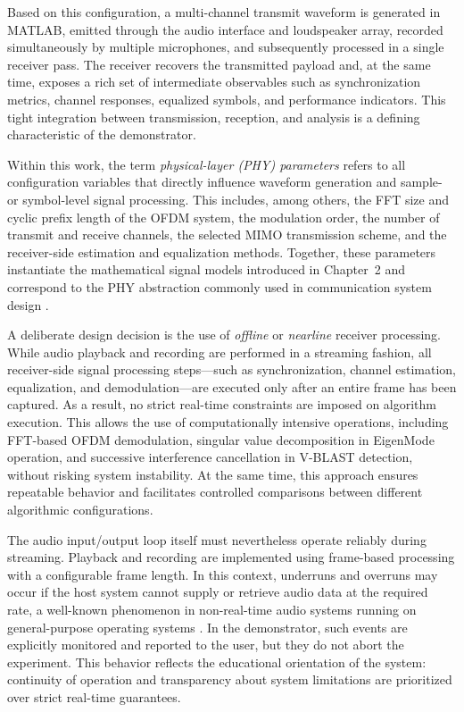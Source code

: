 Based on this configuration, a multi-channel transmit waveform is generated in MATLAB, emitted through the audio interface and loudspeaker array, recorded simultaneously by multiple microphones, and subsequently processed in a single receiver pass. The receiver recovers the transmitted payload and, at the same time, exposes a rich set of intermediate observables such as synchronization metrics, channel responses, equalized symbols, and performance indicators. This tight integration between transmission, reception, and analysis is a defining characteristic of the demonstrator.

Within this work, the term \emph{physical-layer (PHY) parameters} refers to all configuration variables that directly influence waveform generation and sample- or symbol-level signal processing. This includes, among others, the FFT size and cyclic prefix length of the OFDM system, the modulation order, the number of transmit and receive channels, the selected MIMO transmission scheme, and the receiver-side estimation and equalization methods. Together, these parameters instantiate the mathematical signal models introduced in Chapter~2 and correspond to the PHY abstraction commonly used in communication system design \cite{proakis2008digital,tse2005fundamentals}.

A deliberate design decision is the use of \emph{offline} or \emph{nearline} receiver processing. While audio playback and recording are performed in a streaming fashion, all receiver-side signal processing steps—such as synchronization, channel estimation, equalization, and demodulation—are executed only after an entire frame has been captured. As a result, no strict real-time constraints are imposed on algorithm execution. This allows the use of computationally intensive operations, including FFT-based OFDM demodulation, singular value decomposition in EigenMode operation, and successive interference cancellation in V-BLAST detection, without risking system instability. At the same time, this approach ensures repeatable behavior and facilitates controlled comparisons between different algorithmic configurations.

The audio input/output loop itself must nevertheless operate reliably during streaming. Playback and recording are implemented using frame-based processing with a configurable frame length. In this context, underruns and overruns may occur if the host system cannot supply or retrieve audio data at the required rate, a well-known phenomenon in non-real-time audio systems running on general-purpose operating systems \cite{mathworks_apr,mathworks_audio_buffering}. In the demonstrator, such events are explicitly monitored and reported to the user, but they do not abort the experiment. This behavior reflects the educational orientation of the system: continuity of operation and transparency about system limitations are prioritized over strict real-time guarantees.

